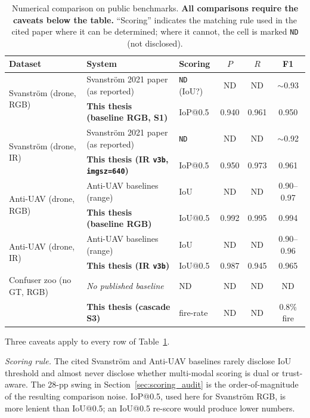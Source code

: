 \begin{table}[htbp]
    \centering
    \caption{Numerical comparison on public benchmarks. \textbf{All comparisons require the caveats below the table.} ``Scoring'' indicates the matching rule used in the cited paper where it can be determined; where it cannot, the cell is marked \texttt{ND} (not disclosed).}
    \label{tab:numerical_comparison}
    \begin{tabular}{lllccc}
        \toprule
        Dataset & System & Scoring & $P$ & $R$ & F1 \\
        \midrule
        \multirow{2}{*}{Svanstr\"om (drone, RGB)} & Svanstr\"om 2021 paper (as reported) & \texttt{ND} (IoU?) & ND & ND & $\sim$0.93 \\
                                                   & \textbf{This thesis (baseline RGB, S1)} & IoP@0.5 & 0.940 & 0.961 & 0.950 \\
        \midrule
        \multirow{2}{*}{Svanstr\"om (drone, IR)}  & Svanstr\"om 2021 paper (as reported) & \texttt{ND} & ND & ND & $\sim$0.92 \\
                                                   & \textbf{This thesis (IR \texttt{v3b}, \texttt{imgsz=640})} & IoP@0.5 & 0.950 & 0.973 & 0.961 \\
        \midrule
        \multirow{2}{*}{Anti-UAV (drone, RGB)}    & Anti-UAV baselines (range) & IoU & ND & ND & 0.90--0.97 \\
                                                   & \textbf{This thesis (baseline RGB)} & IoU@0.5 & 0.992 & 0.995 & 0.994 \\
        \midrule
        \multirow{2}{*}{Anti-UAV (drone, IR)}     & Anti-UAV baselines (range) & IoU & ND & ND & 0.90--0.96 \\
                                                   & \textbf{This thesis (IR \texttt{v3b})} & IoU@0.5 & 0.987 & 0.945 & 0.965 \\
        \midrule
        Confuser zoo (no GT, RGB)                  & \emph{No published baseline} & ND & ND & ND & ND \\
                                                   & \textbf{This thesis (cascade S3)} & fire-rate & ND & ND & 0.8\% fire \\
        \bottomrule
    \end{tabular}
\end{table}

Three caveats apply to every row of Table~\ref{tab:numerical_comparison}.

\emph{Scoring rule.} The cited Svanstr\"om and Anti-UAV baselines rarely disclose IoU threshold and almost never disclose whether multi-modal scoring is dual or trust-aware. The 28-pp swing in Section~\ref{sec:scoring_audit} is the order-of-magnitude of the resulting comparison noise. IoP@0.5, used here for Svanstr\"om RGB, is more lenient than IoU@0.5; an IoU@0.5 re-score would produce lower numbers.

